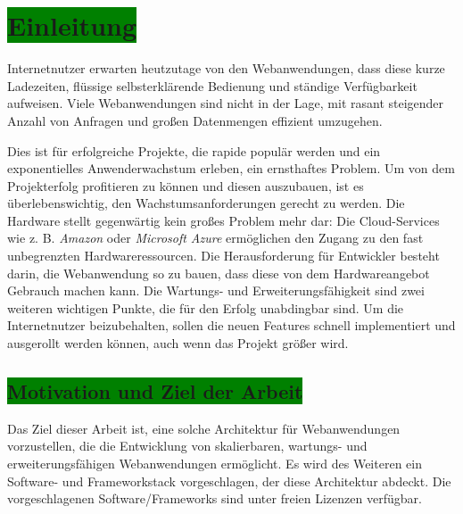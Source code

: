 \chapter{\colorbox{green}{Einleitung}}

Internetnutzer erwarten heutzutage von den Webanwendungen, dass diese kurze Ladezeiten, flüssige selbsterklärende Bedienung und ständige Verfügbarkeit aufweisen. Viele Webanwendungen sind nicht in der Lage, mit rasant steigender Anzahl von Anfragen und großen Datenmengen effizient umzugehen.

Dies ist für erfolgreiche Projekte, die rapide populär werden und ein exponentielles Anwenderwachstum erleben, ein ernsthaftes Problem. Um von dem Projekterfolg profitieren zu können und diesen auszubauen, ist es überlebenswichtig, den Wachstumsanforderungen gerecht zu werden. Die Hardware stellt gegenwärtig kein großes Problem mehr dar: Die Cloud-Services wie z. B. \textit{Amazon} oder \textit{Microsoft Azure} ermöglichen den Zugang zu den fast unbegrenzten Hardwareressourcen. Die Herausforderung für Entwickler besteht darin, die Webanwendung so zu bauen, dass diese von dem Hardwareangebot Gebrauch machen kann. Die Wartungs- und Erweiterungsfähigkeit sind zwei weiteren wichtigen Punkte, die für den Erfolg unabdingbar sind. Um die Internetnutzer beizubehalten, sollen die neuen Features schnell implementiert und ausgerollt werden können, auch wenn das Projekt größer wird.

\section{\colorbox{green}{Motivation und Ziel der Arbeit}}

Das Ziel dieser Arbeit ist, eine solche Architektur für Webanwendungen vorzustellen, die die Entwicklung von skalierbaren, wartungs- und erweiterungsfähigen Webanwendungen ermöglicht. Es wird des Weiteren ein Software-  und Frameworkstack vorgeschlagen, der diese Architektur abdeckt. Die vorgeschlagenen Software/Frameworks sind unter freien Lizenzen verfügbar.

